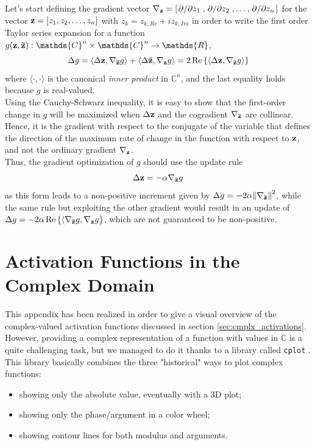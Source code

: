 \documentclass[../main.tex]{subfiles}
\begin{document}
Let's start defining the gradient vector $\nabla_{\vb{z}} = \left[\pdv*{z_1}, \pdv*{z_2},\dots,\pdv*{z_n}\right]$ for the vector $\vb{z}=\left[z_1, z_2, \dots, z_n\right]$ with $z_k = z_{k,Re} + iz_{k,Im}$ in order to write the first order Taylor series expansion for a function $g(\vb{z}, \vb{\bar{z}}):\mathds{C}^n\times\mathds{C}^n\to\mathds{R}$,
\[ \Delta g = \langle \Delta \vb{z}, \nabla_{\vb{\bar{z}}}g \rangle + \langle \Delta \vb{\bar{z}}, \nabla_{\vb{z}}g \rangle = 2\Re\left\{\langle \Delta \vb{z}, \nabla_{\vb{\bar{z}}}g \rangle\right\} \]
where $\langle\cdot,\cdot\rangle$ is the canonical \textit{inner product} in $\mathds{C}^n$, and the last equality holds because $g$ is real-valued.\\
Using the Cauchy-Schwarz inequality, it is easy to show that the first-order change in $g$ will be maximized when $\Delta\vb{z}$ and the cogradient $\nabla_{\vb{\bar{z}}}$ are collinear. Hence, it is the gradient with respect to the conjugate of the variable that defines the direction of the maximum rate of change in the function with respect to $\vb{z}$, and not the ordinary gradient $\nabla_{\vb{z}}$.\\
Thus, the gradient optimization of $g$ should use the update rule
\[ \Delta \vb{z} = -\alpha\nabla_{\vb{\bar{z}}}g \]
as this form leads to a non-positive increment given by $\Delta g = -2\alpha\norm{\nabla_{\vb{\bar{z}}}}^2$, while the same rule but exploiting the other gradient would result in an update of $\Delta g = -2\alpha\Re\left\{\langle\nabla_{\vb{\bar{z}}}g, \nabla_{\vb{z}}g\right\}$, which are not guaranteed to be non-positive.


\chapter{Activation Functions in the Complex Domain}
\label{app:activations}

This appendix has been realized in order to give a visual overview of the complex-valued activation functions discussed in section \ref{sec:cmplx_activations}.\\
However, providing a complex representation of a function with values in $\mathds{C}$ is a quite challenging task, but we managed to do it thanks to a library called \texttt{cplot} \cite{Schlomer_cplot_Plot_complex}.\\
This library basically combines the three "historical" ways to plot complex functions:
\begin{itemize}
	\item showing only the absolute value, eventually with a 3D plot;
	\item showing only the phase/argument in a color wheel;
	\item showing contour lines for both modulus and arguments.
\end{itemize}
\end{document}
